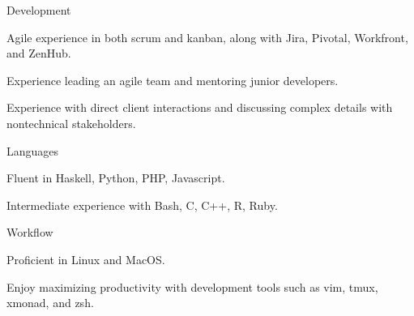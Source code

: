 \begin{cvskills}
  \cvskill
    {Development}
    {\begin{cvitems}
        \item Agile experience in both scrum and kanban, along with Jira,
          Pivotal, Workfront, and ZenHub.
        \item Experience leading an agile team and mentoring junior developers.
        \item Experience with direct client interactions and
          discussing complex details with nontechnical stakeholders.
     \end{cvitems}}
  \cvskill
    {Languages}
    {\begin{cvitems}
        \item Fluent in Haskell, Python, PHP, Javascript.
        \item Intermediate experience with Bash, C, C++, R, Ruby.
     \end{cvitems}}
  \cvskill
    {Workflow}
    {\begin{cvitems}
        \item Proficient in Linux and MacOS.
        \item Enjoy maximizing productivity with development tools such as
          vim, tmux, xmonad, and zsh.
     \end{cvitems}}
\end{cvskills}
